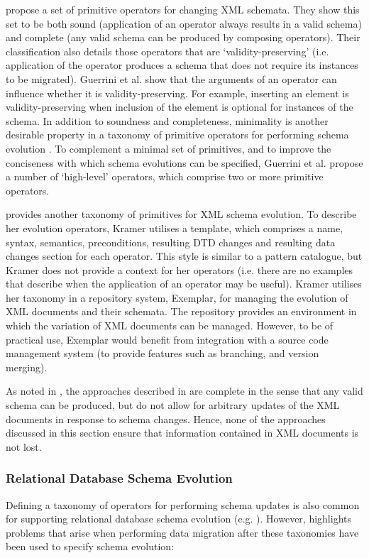 \cite{guerrini05impact} propose a set of primitive operators for changing XML schemata. They show this set to be both sound (application of an operator always results in a valid schema) and complete (any valid schema can be produced by composing operators). Their classification also details those operators that are `validity-preserving' (i.e. application of the operator produces a schema that does not require its instances to be migrated). Guerrini et al. show that the arguments of an operator can influence whether it is validity-preserving. For example, inserting an element is validity-preserving when inclusion of the element is optional for instances of the schema. In addition to soundness and completeness, minimality is another desirable property in a taxonomy of primitive operators for performing schema evolution \cite{su01xem}. To complement a minimal set of primitives, and to improve the conciseness with which schema evolutions can be specified, Guerrini et al. propose a number of `high-level' operators, which comprise two or more primitive operators.

\cite{kramer01xem} provides another taxonomy of primitives for XML schema evolution. To describe her evolution operators, Kramer utilises a template, which comprises a name, syntax, semantics, preconditions, resulting DTD changes and resulting data changes section for each operator. This style is similar to a pattern catalogue, but Kramer does not provide a context for her operators (i.e. there are no examples that describe when the application of an operator may be useful). Kramer utilises her taxonomy in a repository system, Exemplar, for managing the evolution of XML documents and their schemata. The repository provides an environment in which the variation of XML documents can be managed. However, to be of practical use, Exemplar would benefit from integration with a source code management system (to provide features such as branching, and version merging).

As noted in \cite{pizka05automating}, the approaches described in \cite{kramer01xem,su01xem,guerrini05impact} are complete in the sense that any valid schema can be produced, but do not allow for arbitrary updates of the XML documents in response to schema changes. Hence, none of the approaches discussed in this section ensure that information contained in XML documents is not lost.


\subsubsection{Relational Database Schema Evolution}
\label{LitReview:RdbsSchemaEvo}
Defining a taxonomy of operators for performing schema updates is also common for supporting relational database schema evolution (e.g. \cite{edelweiss05temporal,banerjee87semantics}). However, \cite{lerner00model} highlights problems that arise when performing data migration after these taxonomies have been used to specify schema evolution:


